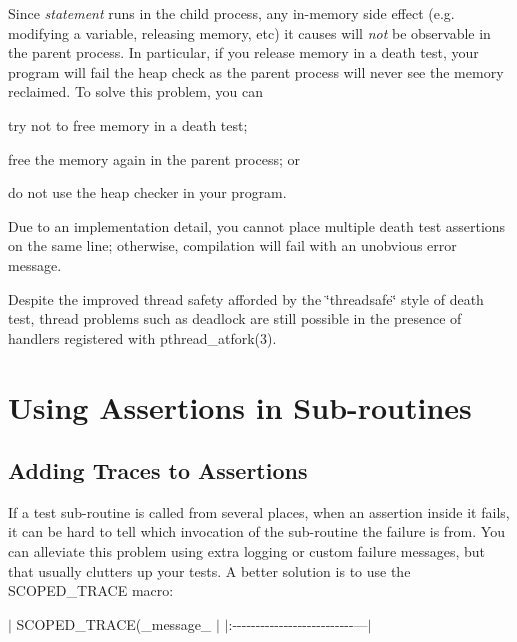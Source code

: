 Since {\itshape statement} runs in the child process, any in-\/memory side effect (e.\+g. modifying a variable, releasing memory, etc) it causes will {\itshape not} be observable in the parent process. In particular, if you release memory in a death test, your program will fail the heap check as the parent process will never see the memory reclaimed. To solve this problem, you can


\begin{DoxyEnumerate}
\item try not to free memory in a death test;
\end{DoxyEnumerate}
\begin{DoxyEnumerate}
\item free the memory again in the parent process; or
\end{DoxyEnumerate}
\begin{DoxyEnumerate}
\item do not use the heap checker in your program.
\end{DoxyEnumerate}

Due to an implementation detail, you cannot place multiple death test assertions on the same line; otherwise, compilation will fail with an unobvious error message.

Despite the improved thread safety afforded by the \char`\"{}threadsafe\char`\"{} style of death test, thread problems such as deadlock are still possible in the presence of handlers registered with {\ttfamily pthread\+\_\+atfork(3)}.

\section*{Using Assertions in Sub-\/routines}

\subsection*{Adding Traces to Assertions}

If a test sub-\/routine is called from several places, when an assertion inside it fails, it can be hard to tell which invocation of the sub-\/routine the failure is from. You can alleviate this problem using extra logging or custom failure messages, but that usually clutters up your tests. A better solution is to use the {\ttfamily S\+C\+O\+P\+E\+D\+\_\+\+T\+R\+A\+CE} macro\+:

$\vert$ {\ttfamily S\+C\+O\+P\+E\+D\+\_\+\+T\+R\+A\+CE(}\+\_\+message\+\_\+{\ttfamily );} $\vert$ $\vert$\+:-\/-\/-\/-\/-\/-\/-\/-\/-\/-\/-\/-\/-\/-\/-\/-\/-\/-\/-\/-\/-\/-\/-\/-\/-\/-\/---$\vert$


